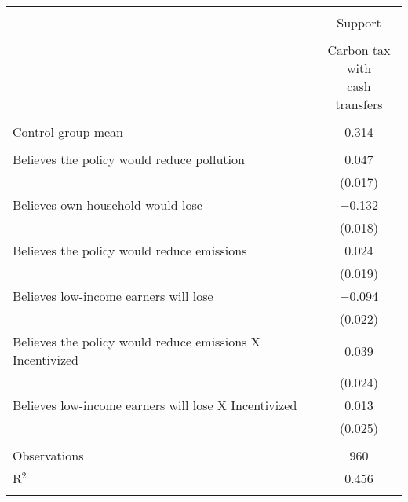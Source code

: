 
\begin{tabular}{@{\extracolsep{5pt}}lc} 
\\[-1.8ex]\hline 
\hline \\[-1.8ex] 
 & \multicolumn{1}{c}{Support} \\ 
\cline{2-2} 
\\[-1.8ex] & \makecell{Carbon tax\\with\\cash transfers} \\ 
\hline \\[-1.8ex] 
Control group mean & 0.314  \\ \hline \\[-1.8ex]
 Believes the policy would reduce pollution & 0.047 \\ 
  & (0.017) \\ 
  Believes own household would lose & $-$0.132 \\ 
  & (0.018) \\ 
  Believes the policy would reduce emissions & 0.024 \\ 
  & (0.019) \\ 
  Believes low-income earners will lose & $-$0.094 \\ 
  & (0.022) \\ 
  Believes the policy would reduce emissions X Incentivized & 0.039 \\ 
  & (0.024) \\ 
  Believes low-income earners will lose X Incentivized & 0.013 \\ 
  & (0.025) \\ 
 \hline \\[-1.8ex] 

Observations & 960 \\ 
R$^{2}$ & 0.456 \\ 
\hline 
\hline \\[-1.8ex] 
\end{tabular} 